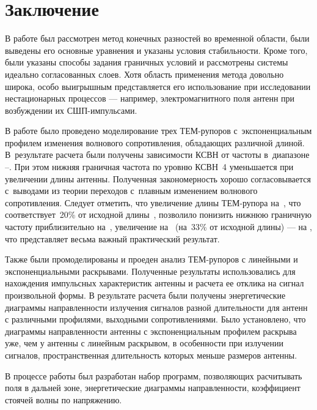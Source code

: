 \chapter*{Заключение}

В работе был рассмотрен метод конечных разностей во временной области, были
выведены его основные уравнения и указаны условия стабильности.
Кроме того, были указаны способы задания граничных условий и рассмотрены
системы идеально согласованных слоев. Хотя область применения метода довольно широка, особо
выигрышным представляется его использование при исследовании нестационарных
процессов --- например, электромагнитного поля антенн при возбуждении их
СШП-импульсами.

В работе было проведено моделирование трех ТЕМ-рупоров с~экспоненциальным профилем
изменения волнового
сопротивления, обладающих различной длиной. В~результате расчета были получены
зависимости КСВН от частоты в~диапазоне --. При этом
нижняя граничная частота по уровню КСВН~4 уменьшается при увеличении длины
антенны. Полученная закономерность хорошо согласовывается с~выводами из теории
переходов с~плавным изменением волнового сопротивления. Следует отметить,
что увеличение длины ТЕМ-рупора на~, что соответствует~20\% от
исходной длины~, позволило понизить нижнюю граничную частоту
приблизительно на~, увеличение на~ (на~33\% от
исходной длины) --- на , что представляет весьма важный
практический результат.

Также были промоделированы и проеден анализ ТЕМ-рупоров с линейными
и экспоненциальными раскрывами. Полученные результаты
использовались для нахождения импульсных характеристик антенны и расчета ее
отклика на сигнал произвольной формы.
В результате расчета были получены энергетические диаграммы
направленности излучения сигналов разной длительности для антенн с различными
профилями, выходными сопротивлениями.
Было установлено, что диаграммы направленности антенны с экспоненциальным
профилем раскрыва уже, чем у антенны с линейным раскрывом, в особенности при
излучении сигналов, пространственная длительность которых меньше размеров
антенны.

В процессе работы был разработан набор программ, позволяющих расчитывать поля
в дальней зоне, энергетические диаграммы направленности, коэффициент стоячей
волны по напряжению.
